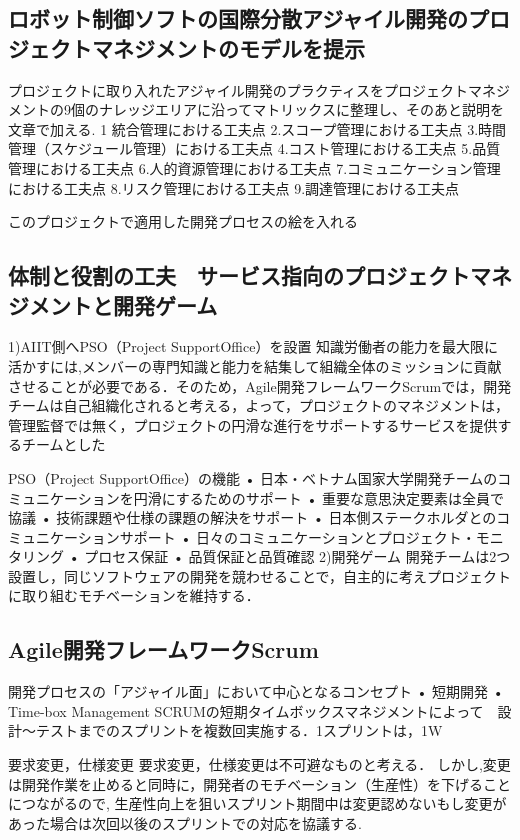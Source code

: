 \documentclass[paper]{jrsj}
\begin{document}
\subsection{ロボット制御ソフトの国際分散アジャイル開発のプロジェクトマネジメントのモデルを提示}
 プロジェクトに取り入れたアジャイル開発のプラクティスをプロジェクトマネジメントの9個のナレッジエリアに沿ってマトリックスに整理し、そのあと説明を文章で加える.
1	統合管理における工夫点
2.スコープ管理における工夫点
3.時間管理（スケジュール管理）における工夫点
4.コスト管理における工夫点
5.品質管理における工夫点
6.人的資源管理における工夫点
7.コミュニケーション管理における工夫点
8.リスク管理における工夫点
9.調達管理における工夫点

このプロジェクトで適用した開発プロセスの絵を入れる


\subsection{体制と役割の工夫　サービス指向のプロジェクトマネジメントと開発ゲーム}
1)AIIT側へPSO（Project SupportOffice）を設置
知識労働者の能力を最大限に活かすには,メンバーの専門知識と能力を結集して組織全体のミッションに貢献させることが必要である．そのため，Agile開発フレームワークScrumでは，開発チームは自己組織化されると考える，よって，プロジェクトのマネジメントは，管理監督では無く，プロジェクトの円滑な進行をサポートするサービスを提供するチームとした

PSO（Project SupportOffice）の機能
•	日本・ベトナム国家大学開発チームのコミュニケーションを円滑にするためのサポート
•	重要な意思決定要素は全員で協議
•	技術課題や仕様の課題の解決をサポート
•	日本側ステークホルダとのコミュニケーションサポート
•	日々のコミュニケーションとプロジェクト・モニタリング
•	プロセス保証
•	品質保証と品質確認
2)開発ゲーム 
開発チームは2つ設置し，同じソフトウェアの開発を競わせることで，自主的に考えプロジェクトに取り組むモチベーションを維持する．

\subsection{Agile開発フレームワークScrum}
開発プロセスの「アジャイル面」において中心となるコンセプト
•	短期開発
•	Time-box Management
SCRUMの短期タイムボックスマネジメントによって　設計～テストまでのスプリントを複数回実施する．1スプリントは，1W

要求変更，仕様変更
要求変更，仕様変更は不可避なものと考える．
しかし,変更は開発作業を止めると同時に，開発者のモチベーション（生産性）を下げることにつながるので, 生産性向上を狙いスプリント期間中は変更認めないもし変更があった場合は次回以後のスプリントでの対応を協議する.
\end{document}
